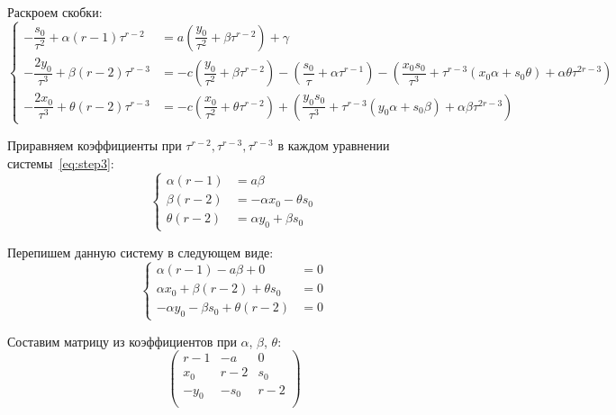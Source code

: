 Раскроем скобки:
\begin{equation*}
  \left\{
    \begin{aligned}
      -\dfrac{s_0}{\tau^{2}} + \alpha (r-1) \tau^{r-2} &= a \left( \dfrac{y_0}{\tau^2} + \beta \tau^{r-2} \right) + \gamma \\
      -\dfrac{2y_0}{\tau^{3}} + \beta (r-2) \tau^{r-3} &= -c \left( \dfrac{y_0}{\tau^2} + \beta \tau^{r-2} \right) - \left( \dfrac{s_0}{\tau} + \alpha \tau^{r-1} \right) - \left( \dfrac{x_0s_0}{\tau^3} + \tau^{r-3}(x_0\alpha + s_0\theta) + \alpha\theta\tau^{2r-3} \right) \\
      -\dfrac{2x_0}{\tau^{3}} + \theta (r-2) \tau^{r-3} &= -c \left( \dfrac{x_0}{\tau^2} + \theta \tau^{r-2} \right) + \left( \dfrac{y_0s_0}{\tau^3} + \tau^{r-3}(y_0\alpha + s_0\beta) + \alpha\beta\tau^{2r-3} \right)
    \end{aligned}
  \right.
\end{equation*}

Приравняем коэффициенты при $ \tau^{r-2}, \tau^{r-3}, \tau^{r-3} $ в каждом уравнении системы~\ref{eq:step3}:
\begin{equation*}
\label{eq:step2_coeff}
	\left\{
		\begin{aligned}
			\alpha (r-1) &= a \beta \\
			\beta  (r-2) &= -\alpha x_0 - \theta s_0 \\
			\theta (r-2) &= \alpha y_0 + \beta s_0
		\end{aligned}
	\right.
\end{equation*}

Перепишем данную систему в следующем виде:
\begin{equation*}
\label{eq:step2_coeff_determinant}
	\left\{
		\begin{aligned}
			\alpha (r-1) - a \beta + 0 &= 0 \\
			\alpha x_0 + \beta (r-2) + \theta s_0 &= 0 \\
			-\alpha y_0	- \beta s_0 + \theta (r-2) &= 0 
		\end{aligned}
	\right.
\end{equation*}

\newpage

Составим матрицу из коэффициентов при $ \alpha $, $ \beta $, $ \theta $:
\begin{equation*}
\label{eq:determinant}
	\left(
		\begin{array}{ccc}
			r-1 & -a & 0 \\
			x_0 & r-2 & s_0 \\
			-y_0 & -s_0 & r-2 \\
		\end{array}
	\right)
\end{equation*}

